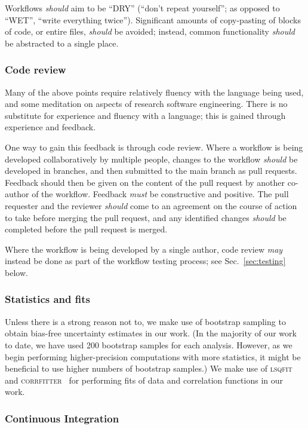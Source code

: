 \documentclass{article}
\newcommand\rfcword[1]{\emph{#1}\xspace}
\newcommand\must{\rfcword{must}}
\newcommand\should{\rfcword{should}}
\newcommand\may{\rfcword{may}}
\newcommand\program[1]{\textsc{#1}\xspace}
\begin{document}
Workflows \should aim to be ``DRY''
(``don't repeat yourself'';
as opposed to ``WET'',
``write everything twice'').
Significant amounts of copy-pasting of blocks of code,
or entire files,
\should be avoided;
instead,
common functionality \should be abstracted to a single place.


\subsubsection{Code review}\label{sec:code-review}

Many of the above points require relatively fluency with the language being used,
and some meditation on aspects of research software engineering.
There is no substitute for experience and fluency with a language;
this is gained through experience and feedback.

One way to gain this feedback is through code review.
Where a workflow is being developed collaboratively by multiple people,
changes to the workflow \should be developed in branches,
and then submitted to the main branch as pull requests.
Feedback should then be given on the content of the pull request
by another co-author of the workflow.
Feedback \must be constructive and positive.
The pull requester and the reviewer \should come to an agreement on
the course of action to take before merging the pull request,
and any identified changes \should be completed before the pull request is merged.

Where the workflow is being developed by a single author,
code review \may instead be done as part of the workflow testing process;
see Sec.~\ref{sec:testing} below.

\subsubsection{Statistics and fits}

Unless there is a strong reason not to,
we make use of bootstrap sampling
to obtain bias-free uncertainty estimates in our work.
(In the majority of our work to date,
we have used 200 bootstrap samples for each analysis.
However,
as we begin performing higher-precision computations with more statistics,
it might be beneficial to use higher numbers of bootstrap samples.)
We make use of
\program{lsqfit}~\cite{lsqfit,peter_lepage_2024_12690493}
and \program{corrfitter}~\cite{corrfitter,peter_lepage_2021_5733391}
for performing fits of data and correlation functions in our work.

\subsubsection{Continuous Integration}
\end{document}
